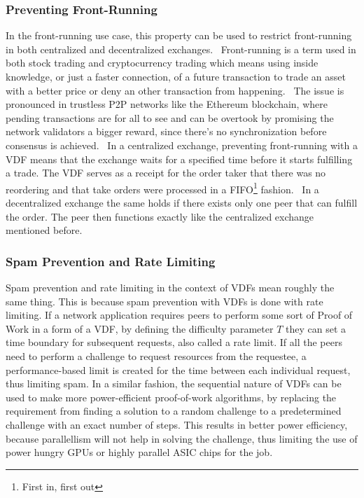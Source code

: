 \subsubsection{Preventing Front-Running}
In the front-running use case, this property can be used to restrict front-running in both centralized and decentralized exchanges.~\cite{Khalil2019-sl} Front-running is a term used in both stock trading and cryptocurrency trading which means using inside knowledge, or just a faster connection, of a future transaction to trade an asset with a better price or deny an other transaction from happening.~\cite{Robinson2020-ve} The issue is pronounced in trustless P2P networks like the Ethereum blockchain, where pending transactions are for all to see and can be overtook by promising the network validators a bigger reward, since there's no synchronization before consensus is achieved.~\cite{Mitchell2020-hn} In a centralized exchange, preventing front-running with a VDF means that the exchange waits for a specified time before it starts fulfilling a trade. The VDF serves as a receipt for the order taker that there was no reordering and that take orders were processed in a FIFO\footnote{First in, first out} fashion.~\cite{Cline2020-wb} In a decentralized exchange the same holds if there exists only one peer that can fulfill the order. The peer then functions exactly like the centralized exchange mentioned before.

\subsubsection{Spam Prevention and Rate Limiting}
Spam prevention and rate limiting in the context of VDFs mean roughly the same thing. This is because spam prevention with VDFs is done with rate limiting. If a network application requires peers to perform some sort of Proof of Work in a form of a VDF, by defining the difficulty parameter \(T\) they can set a time boundary for subsequent requests, also called a rate limit. If all the peers need to perform a challenge to request resources from the requestee, a performance-based limit is created for the time between each individual request, thus limiting spam. In a similar fashion, the sequential nature of VDFs can be used to make more power-efficient proof-of-work algorithms, by replacing the requirement from finding a solution to a random challenge to a predetermined challenge with an exact number of steps. This results in better power efficiency, because parallellism will not help in solving the challenge, thus limiting the use of power hungry GPUs or highly parallel ASIC chips for the job.

